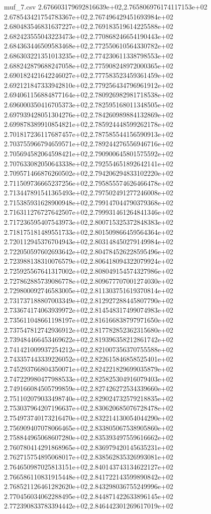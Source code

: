\begin{filecontents*}{muf_7.csv}
2.676603179692816639e+02,2.765806976174117153e+02
2.678543421754783367e+02,2.767496429451693984e+02
2.680483546831637227e+02,2.769183519614225588e+02
2.682423555043223473e+02,2.770868246654190443e+02
2.684363446509583468e+02,2.772550610564330782e+02
2.686303221351013235e+02,2.774230611338798553e+02
2.688242879688247058e+02,2.775908248972000365e+02
2.690182421642246027e+02,2.777583523459361459e+02
2.692121847333942810e+02,2.779256434796961912e+02
2.694061156884877164e+02,2.780926982981718538e+02
2.696000350416705373e+02,2.782595168011348505e+02
2.697939428051304276e+02,2.784260989884132869e+02
2.699878389910854821e+02,2.785924448599262178e+02
2.701817236117687457e+02,2.787585544156590913e+02
2.703755966794659571e+02,2.789244276556946716e+02
2.705694582064598421e+02,2.790900645801575592e+02
2.707633082050643338e+02,2.792554651892642141e+02
2.709571466876260502e+02,2.794206294833102220e+02
2.711509736665237256e+02,2.795855574626466478e+02
2.713447891541365493e+02,2.797502491277246008e+02
2.715385931628900948e+02,2.799147044790379368e+02
2.716311276727642507e+02,2.799931461264841346e+02
2.717236595407543973e+02,2.800715325372848383e+02
2.718175181489551733e+02,2.801509866459564364e+02
2.720112945376704943e+02,2.803148450279149984e+02
2.722050597602693642e+02,2.804784526228595496e+02
2.723988138310076579e+02,2.806418094322079924e+02
2.725925567641317002e+02,2.808049154574327986e+02
2.727862885739086778e+02,2.809677707001274030e+02
2.729800092746583005e+02,2.811303751619370814e+02
2.731737188807003349e+02,2.812927288445807790e+02
2.733674174063939972e+02,2.814548317499074983e+02
2.735611048661198197e+02,2.816166838797971650e+02
2.737547812742936912e+02,2.817782852362315680e+02
2.739484466453469622e+02,2.819396358212861742e+02
2.741421009937254212e+02,2.821007356370755588e+02
2.743357443339226052e+02,2.822615846858525401e+02
2.745293766804350071e+02,2.824221829699035879e+02
2.747229980477988533e+02,2.825825304916079403e+02
2.749166084505799859e+02,2.827426272534339660e+02
2.751102079033498740e+02,2.829024732579218835e+02
2.753037964207196637e+02,2.830620685076728478e+02
2.754973740173216470e+02,2.832214130054044290e+02
2.756909407078066465e+02,2.833805067538905860e+02
2.758844965068607280e+02,2.835393497559616662e+02
2.760780414291868965e+02,2.836979420145635231e+02
2.762715754895068017e+02,2.838562835326993081e+02
2.764650987025813151e+02,2.840143743134622127e+02
2.766586110831915448e+02,2.841722143599890842e+02
2.768521126461282620e+02,2.843298036755249996e+02
2.770456034062288495e+02,2.844871422633896145e+02
2.772390833783394442e+02,2.846442301269617019e+02

\end{filecontents*}
